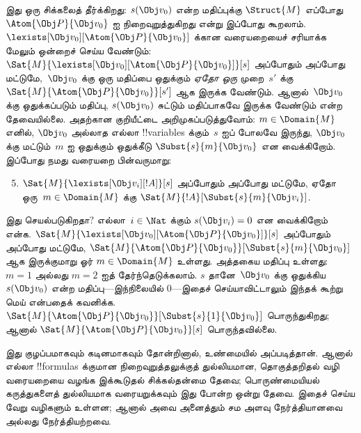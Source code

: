 \documentclass[../../../include/open-logic-section]{subfiles}
\begin{document}
இது ஒரு சிக்கலைத் தீர்க்கிறது: $s(\Obj v_0)$ என்ற மதிப்புக்கு
$\Struct{M}$ எப்போது $\Atom{\Obj P}{\Obj v_0}$ ஐ நிறைவுறுத்துகிறது என்று
இப்போது கூறலாம். $\lexists[\Obj v_0][\Atom{\Obj P}{\Obj v_0}]$ க்கான
வரையறையைச் சரியாக்க மேலும் ஒன்றைச் செய்ய வேண்டும்:
$\Sat{M}{\lexists[\Obj v_0][\Atom{\Obj P}{\Obj v_0}]}[s]$ அப்போதும் அப்போது
மட்டுமே,~$\Obj v_0$ க்கு ஒரு மதிப்பை ஒதுக்கும் \emph{ஏதோ ஒரு} முறை~$s'$ க்கு
$\Sat{M}{\Atom{\Obj P}{\Obj v_0}}[s']$ ஆக இருக்க வேண்டும். ஆனால்~$\Obj v_0$
க்கு ஒதுக்கப்படும் மதிப்பு, $s(\Obj v_0)$ சுட்டும் மதிப்பாகவே இருக்க வேண்டும்
என்ற தேவையில்லை. அதற்கான குறியீட்டை அறிமுகப்படுத்துவோம்: $m \in \Domain{M}$
எனில், $\Obj v_0$ அல்லாத எல்லா !!{variable}s க்கும்~$s$ ஐப் போலவே இருந்து,
$\Obj v_0$ க்கு மட்டும்~$m$ ஐ ஒதுக்கும் ஒதுக்கீடு
$\Subst{s}{m}{\Obj v_0}$ என வைக்கிறோம். இப்போது நமது வரையறை பின்வருமாறு:
\begin{enumerate}\setcounter{enumi}{4}
  \item $\Sat{M}{\lexists[\Obj v_i][!A]}[s]$ அப்போதும் அப்போது மட்டுமே,
  ஏதோ ஒரு~$m \in \Domain{M}$ க்கு
  $\Sat{M}{!A}[\Subst{s}{m}{\Obj v_i}]$.
\end{enumerate}
இது செயல்படுகிறதா? எல்லா~$i \in \Nat$ க்கும் $s(\Obj v_i) = 0$ என
வைக்கிறோம் என்க. $\Sat{M}{\lexists[\Obj v_0][\Atom{\Obj P}{\Obj v_0}]}[s]$
அப்போதும் அப்போது மட்டுமே, $\Sat{M}{\Atom{\Obj P}{\Obj
v_0}}[\Subst{s}{m}{\Obj v_0}]$ ஆக இருக்குமாறு ஓர் $m \in \Domain{M}$ உள்ளது.
அத்தகைய மதிப்பு உள்ளது: $m = 1$ அல்லது $m = 2$ ஐத் தேர்ந்தெடுக்கலாம்.
$s$ தானே~$\Obj v_0$ க்கு ஒதுக்கிய $s(\Obj v_0)$ என்ற மதிப்பு---இந்நிலையில்
$0$---இதைச் செய்யாவிட்டாலும் இந்தக் கூற்று மெய் என்பதைக் கவனிக்க.
$\Sat{M}{\Atom{\Obj P}{\Obj v_0}}[\Subst{s}{1}{\Obj v_0}]$ பொருந்துகிறது;
ஆனால் $\Sat{M}{\Atom{\Obj P}{\Obj v_0}}[s]$ பொருந்தவில்லை.

இது குழப்பமாகவும் கடினமாகவும் தோன்றினால், உண்மையில் அப்படித்தான். ஆனால் எல்லா
!!{formula}s க்குமான நிறைவுறுத்தலுக்குத் துல்லியமான, தொகுத்தறிதல் வழி
வரையறையை வழங்க இக்கூடுதல் சிக்கல்தன்மை தேவை; பொருண்மையியல் கருத்துகளைத்
துல்லியமாக வரையறுக்கவும் இது போன்ற ஒன்று தேவை. இதைச் செய்ய வேறு வழிகளும்
உள்ளன; ஆனால் அவை அனைத்தும் சம அளவு நேர்த்தியானவை அல்லது நேர்த்தியற்றவை.
\end{document}
